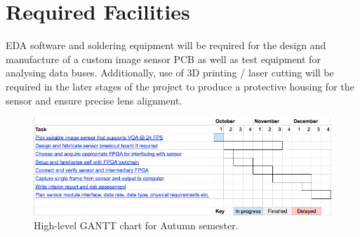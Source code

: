 \documentclass[a4paper]{article}
\begin{document}
\section{Required Facilities}

EDA software and soldering equipment will be required for the design and manufacture of a custom image sensor PCB as well as test equipment for analysing data buses. Additionally, use of 3D printing / laser cutting will be required in the later stages of the project to produce a protective housing for the sensor and ensure precise lens alignment.

\begin{figure}
\centering
\includegraphics[width=1\textwidth]{gantt_chart.png}
\caption{\label{fig:gantt_chart}High-level GANTT chart for Autumn semester.}
\end{figure}
\end{document}
